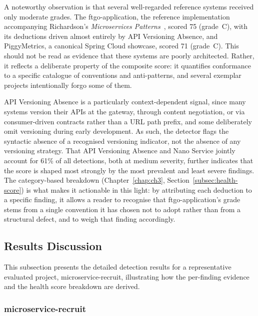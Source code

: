 \par A noteworthy observation is that several well-regarded reference systems received only moderate grades. The ftgo-application, the reference implementation accompanying Richardson's \textit{Microservices Patterns}~\cite{Richardson2018}, scored 75 (grade~C), with its deductions driven almost entirely by API Versioning Absence, and PiggyMetrics, a canonical Spring Cloud showcase, scored 71 (grade~C). This should not be read as evidence that these systems are poorly architected. Rather, it reflects a deliberate property of the composite score: it quantifies conformance to a specific catalogue of conventions and anti-patterns, and several exemplar projects intentionally forgo some of them.

\par API Versioning Absence is a particularly context-dependent signal, since many systems version their APIs at the gateway, through content negotiation, or via consumer-driven contracts rather than a URL path prefix, and some deliberately omit versioning during early development. As such, the detector flags the syntactic absence of a recognised versioning indicator, not the absence of any versioning strategy. That API Versioning Absence and Nano Service jointly account for 61\% of all detections, both at medium severity, further indicates that the score is shaped most strongly by the most prevalent and least severe findings. The category-based breakdown (Chapter~\ref{chap:ch3}, Section~\ref{subsec:health-score}) is what makes it actionable in this light: by attributing each deduction to a specific finding, it allows a reader to recognise that ftgo-application's grade stems from a single convention it has chosen not to adopt rather than from a structural defect, and to weigh that finding accordingly.

\subsection{Results Discussion}
\label{subsec:discussion-results}

\par This subsection presents the detailed detection results for a representative evaluated project, microservice-recruit, illustrating how the per-finding evidence and the health score breakdown are derived.

\subsubsection{microservice-recruit}
\label{subsubsec:results-microservice-recruit}

